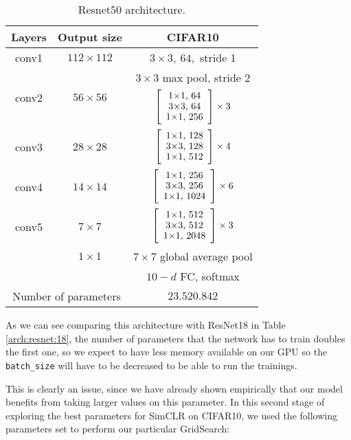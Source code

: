 \begin{table}[H]
    \centering
    \begin{tabular}{|c|c|c|}
    \hline
    Layers                 & Output size                    & CIFAR10                         \\ \hline
    conv1                  & $112\times112$                 & $3\times3, \ 64,$ stride 1      \\ \hline
    \multirow{2}{*}{conv2} & \multirow{2}{*}{$56\times 56$} & $3\times3$ max pool, stride 2   \\ \cline{3-3} 
                           &                                & $\blockb{256}{64}{3}$           \\ \hline
    conv3                  & $28 \times 28$                 & $\blockb{512}{128}{4}$          \\ \hline
    conv4                  & $14 \times 14$                 & $\blockb{1024}{256}{6}$         \\ \hline
    conv5                  & $7 \times 7$                   & $\blockb{2048}{512}{3}$         \\ \hline
    \multirow{2}{*}{}      & $1\times 1$                    & $7\times 7$ global average pool \\ \cline{2-3} 
                           &                                & $10-d$ FC, softmax              \\ \hline
    \multicolumn{2}{|c|}{Number of parameters}              & $23.520.842$                    \\ \hline
    \end{tabular}
    \caption{Resnet50 architecture.}
    \label{table:resnet:50}
\end{table}

    As we can see comparing this architecture with ResNet18 in Table \ref{arch:resnet:18}, the number of parameters that the network has to train doubles the first one, so we expect to have less memory available on our GPU so the \lstinline{batch_size} will have to be decreased to be able to run the trainings. 
    
    This is clearly an issue, since we have already shown empirically that our model benefits from taking larger values on this parameter. In this second stage of exploring the best parameters for SimCLR on CIFAR10, we used the following parameters set to perform our particular GridSearch:
    
